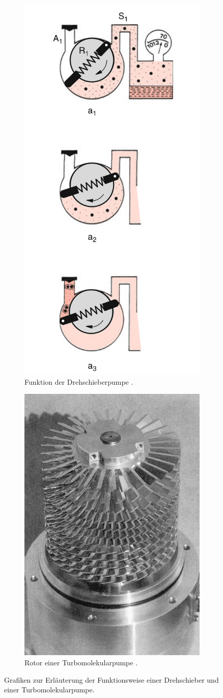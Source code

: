 \begin{figure}
  \centering
  \begin{subfigure}{0.49\textwidth}
    \centering
    \includegraphics[height = \textwidth]{theorie_plots/drehschieber.png}
    \caption{Funktion der Drehschieberpumpe \cite{dem1}.}
    \label{fig: drehschieber}
\end{subfigure}
\begin{subfigure}{0.49\textwidth}
  \centering
  \includegraphics[height = \textwidth]{theorie_plots/turbo_pumpe.png}
  \caption{Rotor einer Turbomolekularpumpe \cite{dem1}.}
  \label{fig: turbo}
\end{subfigure}
\caption{Grafiken zur Erläuterung der Funktionsweise einer Drehschieber und einer Turbomolekularpumpe.}  %
\label{fig: turbo_drehschieber}
\end{figure}
\FloatBarrier

